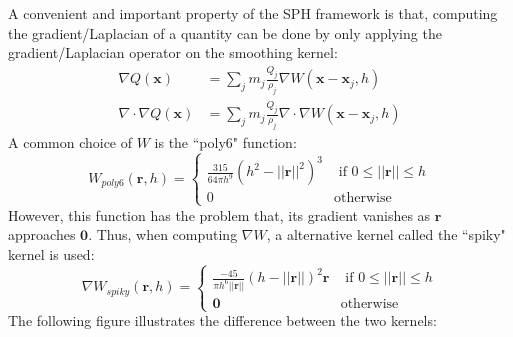 A convenient and important property of the SPH framework is that, computing the gradient/Laplacian of a quantity can be done by only applying the gradient/Laplacian operator on the smoothing kernel:
\begin{equation}
    \label{eqn SPH derivative}
    \begin{aligned}
        \nabla Q(\textbf{x}) &= \sum_{j} m_j \frac{Q_j}{\rho_j} \nabla W(\textbf{x}-\textbf{x}_j,h) \\
        \nabla \cdot \nabla Q(\textbf{x}) &= \sum_{j} m_j \frac{Q_j}{\rho_j} \nabla \cdot \nabla W(\textbf{x}-\textbf{x}_j,h)
    \end{aligned}
\end{equation}
A common choice of $W$ is the ``poly6" function:
$$
    W_{poly6}(\textbf{r},h)=
        \begin{cases}
            \frac{315}{64\pi h^9}(h^2-||\textbf{r}||^2)^3 &\mbox{ if } 0\leq||\textbf{r}||\leq h\\
            0 &\mbox{otherwise} 
        \end{cases}
$$
However, this function has the problem that, its gradient vanishes as $\textbf{r}$ approaches $\textbf{0}$. Thus, when computing $\nabla W$, a alternative kernel called the ``spiky" kernel is used:
$$
    \nabla W_{spiky}(\textbf{r},h)=
        \begin{cases}
            \frac{-45}{\pi h^6||\textbf{r}||}(h-||\textbf{r}||)^2\textbf{r} &\mbox{ if } 0\leq||\textbf{r}||\leq h\\
            \textbf{0} &\mbox{otherwise} 
        \end{cases}
$$
The following figure illustrates the difference between the two kernels:

